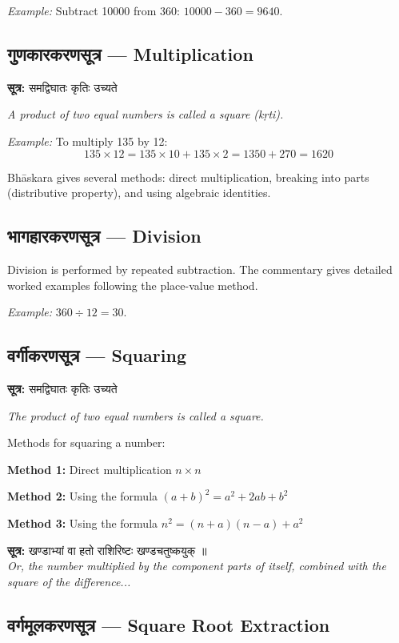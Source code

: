 \documentclass[10pt,a4paper]{article}
\newenvironment{sanskritverse}{%
  \begin{center}%
  \begin{minipage}{0.94\textwidth}%
  \centering\devanagarifont\small%
}{%
  \end{minipage}%
  \end{center}%
  \vspace{0.1em}%
}
\newcommand{\sutratxt}[2]{%
  \begin{center}%
  \colorbox{sanskritbg}{%
    \begin{minipage}{0.93\textwidth}%
    \centering\small\vspace{3pt}%
    {\devanagarifont\textbf{सूत्र:} #1}\par\vspace{2pt}%
    \textit{#2}\vspace{3pt}%
    \end{minipage}%
  }%
  \end{center}%
  \vspace{0.1em}%
}
\begin{document}
\textit{Example:} Subtract 10000 from 360: $10000 - 360 = 9640$.

\subsection{गुणकारकरणसूत्र — Multiplication}

\sutratxt{समद्विघातः कृतिः उच्यते}{A product of two equal numbers is called a square (kṛti).}

\textit{Example:} To multiply 135 by 12:
\[
135 \times 12 = 135 \times 10 + 135 \times 2 = 1350 + 270 = 1620
\]

Bhāskara gives several methods: direct multiplication, breaking into parts (distributive property), and using algebraic identities.

\subsection{भागहारकरणसूत्र — Division}

Division is performed by repeated subtraction. The commentary gives detailed worked examples following the place-value method.

\textit{Example:} $360 \div 12 = 30$.

\subsection{वर्गीकरणसूत्र — Squaring}

\sutratxt{समद्विघातः कृतिः उच्यते}{The product of two equal numbers is called a square.}

Methods for squaring a number:

\textbf{Method 1:} Direct multiplication $n \times n$

\textbf{Method 2:} Using the formula $(a+b)^2 = a^2 + 2ab + b^2$

\textbf{Method 3:} Using the formula $n^2 = (n+a)(n-a) + a^2$

\begin{sanskritverse}
\textbf{सूत्र:} खण्डाभ्यां वा हतो राशिरिष्टः खण्डचतुष्कयुक् ॥\\
\textit{Or, the number multiplied by the component parts of itself, combined with the square of the difference...}
\end{sanskritverse}

\subsection{वर्गमूलकरणसूत्र — Square Root Extraction}
\end{document}
